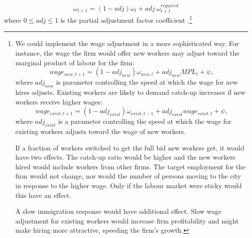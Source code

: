 \begin{equation}
\omega_{t+1}= (1-adj)\omega_{t} + adj\ \omega^{required}_{t+1}
\end{equation}
where $0\le adj \le 1$ is the partial adjustment factor coefficient
.\footnote{We could implement the wage adjustment in a more sophisticated way. For instance, the wage the firm would offer new workers may adjust toward the marginal product of labour for the firm: %
\begin{equation}wage_{new,t+1}= (1-adj_{new})\omega_{new,t} + adj_{new} MPL_{t}  +\psi, \end{equation}
where $adj_{new}$ is parameter controlling the speed at which the wage for new hires adjusts. 
Existing workers are likely to demand catch-up increases if new workers receive higher wages:
\begin{equation} wage_{exist,t+1}= (1-adj_{exist}) \omega_{exist, t-1} + adj_{exist} wage_{exist,t}  +\psi, \end{equation}
where $adj_{exist}$ is a parameter controlling the speed at which the wage for existing workers adjusts toward the wage of new workers.

If a fraction of workers switched to get the full bid new workers get, it would have two effects. The catch-up ratio would be higher and the new workers hired would include workers from other firms. The target employment for the firm would not change, nor would the number of persons moving to the city in response to the higher wage. Only if the labour market were sticky would this have an effect.

A slow immigration response would have additional effect.
Slow wage adjustment for existing workers would increase firm profitability and might make hiring more attractive, speeding the firm's growth.}




